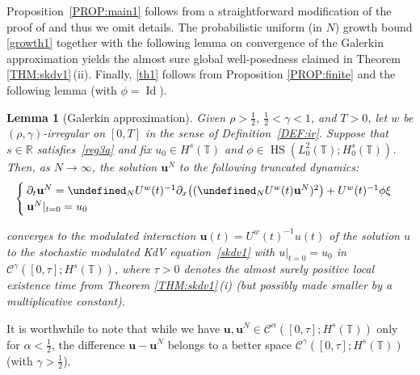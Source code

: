 \documentclass[letterpaper, 11pt,  reqno]{amsart}
\newtheorem{lemma}[theorem]{Lemma}
\DeclareMathOperator{\HS}{HS}
\DeclareMathOperator{\Id}{Id}
\newcommand{\1}{\hspace{0.5mm}\text{I}\hspace{0.5mm}}
\newcommand{\noi}{\noindent}
\newcommand{\R}{\mathbb{R}}
\newcommand{\T}{\mathbb{T}}
\let\P= \undefined
\newcommand{\P}{\mathbf{P}}
\newcommand{\al}{\alpha}
\newcommand{\g}{\gamma}
\newcommand{\dx}{\partial_x}
\newcommand{\dt}{\partial_t}
\newcommand{\cC}{\mathcal{C}}
\newcommand{\uw}{U^w}
\newcommand{\uu}{\mathbf{u}}
\numberwithin{equation}{section}
\numberwithin{theorem}{section}
\begin{document}
Proposition~\ref{PROP:main1}
follows from a straightforward modification of the proof of 
 \cite[Proposition~4.1]{OQS} and thus we omit details.
The probabilistic uniform (in $N$) growth bound
\eqref{growth1}
together with the following lemma
on convergence of the Galerkin approximation 
yields
the almost sure global well-posedness
claimed in 
Theorem \ref{THM:skdv1}\,(ii).
 Finally, \eqref{th1}
 follows from Proposition \ref{PROP:finite}
 and 
the following lemma
(with $\phi = \Id$).
 




\begin{lemma}[Galerkin approximation]\label{LEM:Ga1}
Given $\rho > \frac 12$,  $\frac12< \g < 1$, and $T> 0$, 
let  $w$ be $(\rho,\g)$-irregular on $[0, T]$ in the sense of Definition~\ref{DEF:ir}.
Suppose that  $s \in \R$ satisfies~\eqref{reg3a}
and fix 
 $u_0 \in H^s(\T)$
and  $\phi \in \HS(L^2_0(\T); H^s_0(\T))$.
Then, as $N \to \infty$, 
the solution $\uu^N$
to the following truncated dynamics\textup{:}
\begin{equation}
\label{KdV9}
\begin{cases}
\dt \uu^N = \P_N\uw(t)^{-1} \dx\big( (\P_N \uw(t) \uu^N)^2\big) +  \uw(t)^{-1}\phi \xi\\
\uu^N|_{t = 0} = u_0 
\end{cases}
\end{equation}


\noi
converges to 
the modulated interaction $\uu(t) = \uw(t)^{-1}u(t)$
of the solution $u$
to 
 the stochastic modulated KdV equation~\eqref{skdv1}
 with $u|_{t = 0} = u_0$
in $\cC^\g([0, \tau]; H^s(\T))$, 
where $\tau > 0$ denotes the almost surely positive local existence time
from Theorem \ref{THM:skdv1}\,(i)
\textup{(}but 
possibly  made  smaller by a multiplicative constant\textup{)}. 


\end{lemma}

It is worthwhile to note that while we have $\uu, \uu^N 
\in \cC^\al([0, \tau]; H^s(\T))$
only for   $  \al < \frac 12$, 
the difference 
 $\uu - \uu^N$ 
 belongs to a better space
 $\cC^\g([0, \tau]; H^s(\T))$ (with $\g > \frac 12$).
 
\end{document}
